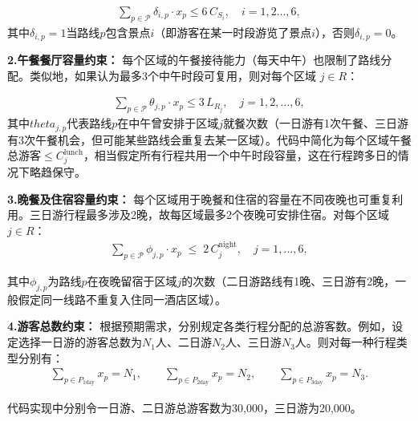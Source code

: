 \begin{equation}
  \begin{aligned}
    \sum_{p\in \mathcal{P}}\delta_{i,p}\cdot x_{p} \leq 6\,C_{S_{i}},\quad i=1,2\dots ,6,
  \end{aligned}
\end{equation}
其中$\delta_{i,p}=1$当路线$p$包含景点$i$（即游客在某一时段游览了景点$i$），否则$\delta_{i,p}=0$。

\noindent\textbf{2.午餐餐厅容量约束：}
每个区域的午餐接待能力（每天中午）也限制了路线分配。类似地，如果认为最多3个中午时段可复用，则对每个区域 $j\in R$：

\begin{equation}
  \begin{aligned}
    \sum_{p\in \mathcal{P}}\theta_{j,p}\cdot x_{p} \leq 3\,L_{R_{j}},\quad j=1,2,\dots ,6,
  \end{aligned}
\end{equation}
其中$theta_{j,p}$代表路线$p$在中午曾安排于区域$j$就餐次数（一日游有1次午餐、三日游有3次午餐机会，但可能某些路线会重复去某一区域）。代码中简化为每个区域午餐总游客$\le C^{\text{lunch}}_j$，相当假定所有行程共用一个中午时段容量，这在行程跨多日的情况下略趋保守。

\noindent\textbf{3.晚餐及住宿容量约束：}
每个区域用于晚餐和住宿的容量在不同夜晚也可重复利用。三日游行程最多涉及2晚，故每区域最多2个夜晚可安排住宿。对每个区域 $j\in R$：
\begin{equation}
  \begin{aligned}
    \sum_{p\in \mathcal{P}}\phi_{j,p}\cdot x_p \;\le\; 2\,C^{\text{night}}_j, \quad j=1,\dots,6,
  \end{aligned}
\end{equation}

其中$\phi_{j,p}$为路线$p$在夜晚留宿于区域$j$的次数（二日游路线有1晚、三日游有2晚，一般假定同一线路不重复入住同一酒店区域）。

\noindent\textbf{4.游客总数约束：}
根据预期需求，分别规定各类行程分配的总游客数。例如，设定选择一日游的游客总数为$N_{1}$人、二日游$N_{2}$人、三日游$N_{3}$人。则对每一种行程类型分别有：
\begin{equation}
  \begin{aligned}
    \sum_{p\in P_{1\text{day}}}x_p = N_{1},\qquad \sum_{p\in P_{2\text{day}}}x_p = N_{2},\qquad \sum_{p\in P_{3\text{day}}}x_p = N_{3}.    
  \end{aligned}
\end{equation}

代码实现中分别令一日游、二日游总游客数为30,000，三日游为20,000。

